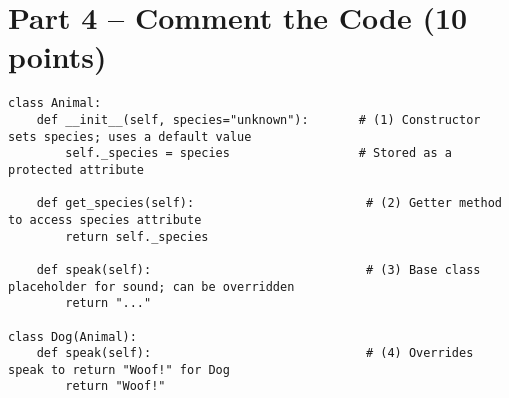\documentclass[12pt]{article}
\begin{document}
\newpage

\section*{Part 4 – Comment the Code (10 points)}

\begin{verbatim}
class Animal:
    def __init__(self, species="unknown"):       # (1) Constructor sets species; uses a default value
        self._species = species                  # Stored as a protected attribute

    def get_species(self):                        # (2) Getter method to access species attribute
        return self._species

    def speak(self):                              # (3) Base class placeholder for sound; can be overridden
        return "..."

class Dog(Animal):
    def speak(self):                              # (4) Overrides speak to return "Woof!" for Dog
        return "Woof!"
\end{verbatim}
\end{document}
